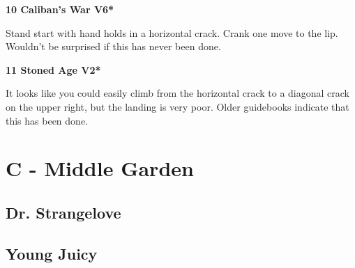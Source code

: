 \begin{multicols}{2}
\needspace{1.5cm}
\label{rt:Caliban's War}
\colorbox{RoyalBlue!20}{
\parbox{0.95\linewidth}{
\textbf{
10 Caliban's War V6*  
}}}

\begin{adjustwidth}{0.5cm}{}			
Stand start with hand holds in a horizontal crack. Crank one move to the lip. Wouldn't be surprised if this has never been done.
\end{adjustwidth}



\needspace{1.5cm}
\label{rt:Stoned Age}
\colorbox{green!20}{
\parbox{0.95\linewidth}{
\textbf{
11 Stoned Age V2*  
}}}

\begin{adjustwidth}{0.5cm}{}			
It looks like you could easily climb from the horizontal crack to a diagonal crack on the upper right, but the landing is very poor. Older guidebooks indicate that this has been done.
\end{adjustwidth}




\newpage

\section{C - Middle Garden}\label{sa:Middle Garden}




\needspace{1.5cm}
\subsection*{Dr. Strangelove}\label{bf:Dr. Strangelove}
	



\needspace{1.5cm}
\subsection*{Young Juicy}\label{bf:Young Juicy}
	




\end{multicols}
\clearpage